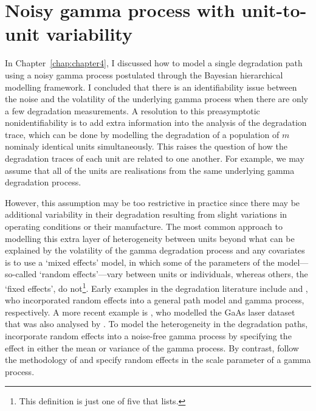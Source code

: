 \chapter{Noisy gamma process with unit-to-unit variability} \label{chap:chapter5}

In Chapter~\ref{chap:chapter4}, I discussed how to model a single degradation path using a noisy gamma process postulated through the Bayesian hierarchical modelling framework. I concluded that there is an identifiability issue between the noise and the volatility of the underlying gamma process when there are only a few degradation measurements. A resolution to this preasymptotic nonidentifiability is to add extra information into the analysis of the degradation trace, which can be done by modelling the degradation of a population of $m$ nominaly identical units simultaneously. This raises the question of how the degradation traces of each unit are related to one another. For example, we may assume that all of the units are realisations from the same underlying gamma degradation process.

However, this assumption may be too restrictive in practice since there may be additional variability in their degradation resulting from slight variations in operating conditions or their manufacture. The most common approach to modelling this extra layer of heterogeneity between units beyond what can be explained by the volatility of the gamma degradation process and any covariates is to use a `mixed effects' model, in which some of the parameters of the model---so-called `random effects'---vary between units or individuals, whereas others, the `fixed effects', do not\footnote{This definition is just one of five that \citet{Gelman2005} lists.}. Early examples in the degradation literature include \citet{lu1993} and \citet{lawless2004}, who incorporated random effects into a general path model and gamma process, respectively. A more recent example is \citet{rodriguez-picon2018}, who modelled the GaAs laser dataset that was also analysed by \citet{Meeker1998}. To model the heterogeneity in the degradation paths, \citet{rodriguez-picon2018} incorporate random effects into a noise-free gamma process by specifying the effect in either the mean or variance of the gamma process. By contrast, \citet{peng_2018} follow the methodology of \citet{lawless2004} and specify random effects in the scale parameter of a gamma process.

